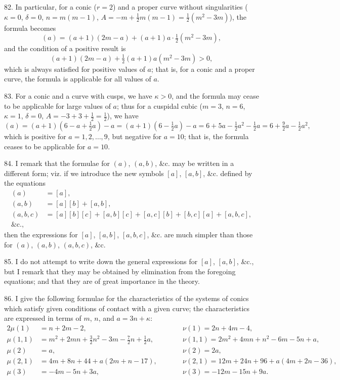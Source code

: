 \documentclass[12pt,a4paper]{article}
\begin{document}
82. In particular, for a conic ($r = 2$) and a proper curve without singularities ($\kappa = 0$, $\delta = 0$, $n = m(m-1)$, $A = -m + \tfrac{1}{2}m(m-1) = \tfrac{1}{2}(m^2 - 3m)$), the formula becomes
\[
(a) = (a+1)(2m - a) + (a+1)a \cdot \tfrac{1}{2}(m^2 - 3m),
\]
and the condition of a positive result is
\[
(a+1)(2m - a) + \tfrac{1}{2}(a+1)a(m^2 - 3m) > 0,
\]
which is always satisfied for positive values of $a$; that is, for a conic and a proper curve, the formula is applicable for all values of $a$.

83. For a conic and a curve with cusps, we have $\kappa > 0$, and the formula may cease to be applicable for large values of $a$; thus for a cuspidal cubic ($m = 3$, $n = 6$, $\kappa = 1$, $\delta = 0$, $A = -3 + 3 + \tfrac{1}{2} = \tfrac{1}{2}$), we have
\[
(a) = (a+1)(6 - a + \tfrac{1}{2}a) - a = (a+1)(6 - \tfrac{1}{2}a) - a = 6 + 5a - \tfrac{1}{2}a^2 - \tfrac{1}{2}a = 6 + \tfrac{9}{2}a - \tfrac{1}{2}a^2,
\]
which is positive for $a = 1, 2, \ldots, 9$, but negative for $a = 10$; that is, the formula ceases to be applicable for $a = 10$.

84. I remark that the formulae for $(a)$, $(a, b)$, \&c. may be written in a different form; viz. if we introduce the new symbols $[a]$, $[a, b]$, \&c. defined by the equations
\begin{align*}
(a) &= [a],\\
(a, b) &= [a][b] + [a, b],\\
(a, b, c) &= [a][b][c] + [a, b][c] + [a, c][b] + [b, c][a] + [a, b, c],\\
\text{\&c.},
\end{align*}
then the expressions for $[a]$, $[a, b]$, $[a, b, c]$, \&c. are much simpler than those for $(a)$, $(a, b)$, $(a, b, c)$, \&c.

85. I do not attempt to write down the general expressions for $[a]$, $[a, b]$, \&c., but I remark that they may be obtained by elimination from the foregoing equations; and that they are of great importance in the theory.

86. I give the following formulae for the characteristics of the systems of conics which satisfy given conditions of contact with a given curve; the characteristics are expressed in terms of $m$, $n$, and $a = 3n + \kappa$:
\begin{alignat*}{2}
\mu(1) &= n + 2m - 2,\qquad &&\nu(1) = 2n + 4m - 4,\\
\mu(1, 1) &= m^2 + 2mn + \tfrac{3}{2}n^2 - 3m - \tfrac{7}{2}n + \tfrac{1}{2}a,\qquad &&\nu(1, 1) = 2m^2 + 4mn + n^2 - 6m - 5n + a,\\
\mu(2) &= a,\qquad &&\nu(2) = 2a,\\
\mu(2, 1) &= 4m + 8n + 44 + a(2m + n - 17),\qquad &&\nu(2, 1) = 12m + 24n + 96 + a(4m + 2n - 36),\\
\mu(3) &= -4m - 5n + 3a,\qquad &&\nu(3) = -12m - 15n + 9a.
\end{alignat*}
\end{document}
